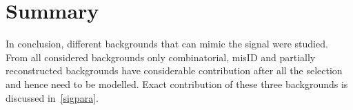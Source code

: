 \section{Summary}
In conclusion, different backgrounds that can mimic the signal were studied. From all considered backgrounds only combinatorial, misID and partially reconstructed backgrounds have considerable contribution after all the selection and hence need to be modelled. Exact contribution of these three backgrounds is discussed in~\autoref{sigpara}.

